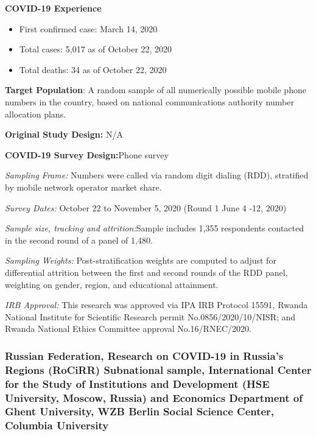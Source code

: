 \documentclass[
  12pt,
]{article}
\begin{document}
\textbf{COVID-19 Experience}

\begin{itemize}
 \item First confirmed case: March 14, 2020
 \item Total cases:  5,017 as of October 22, 2020 
\item Total deaths:  34 as of October 22, 2020 
\end{itemize}

\textbf{Target Population}: A random sample of all numerically possible mobile phone numbers in the country, based on national communications authority number allocation plans.

\textbf{Original Study Design:} N/A

\textbf{COVID-19 Survey Design:}Phone survey

\emph{Sampling Frame:} Numbers were called via random digit dialing (RDD), stratified by mobile network operator market share.

\emph{Survey Dates:} October 22 to November 5, 2020 (Round 1 June 4 -12, 2020)

\emph{Sample size, tracking and attrition:}Sample includes 1,355 respondents contacted in the second round of a panel of 1,480.

\emph{Sampling Weights:} Post-stratification weights are computed to adjust for differential attrition between the first and second rounds of the RDD panel, weighting on gender, region, and educational attainment.

\emph{IRB Approval:} This research was approved via IPA IRB Protocol 15591, Rwanda National Institute for Scientific Research permit No.0856/2020/10/NISR; and Rwanda National Ethics Committee approval No.16/RNEC/2020.

\hypertarget{russian-federation-research-on-covid-19-in-russias-regions-rocirr-subnational-sample-international-center-for-the-study-of-institutions-and-development-hse-university-moscow-russia-and-economics-department-of-ghent-university-wzb-berlin-social-science-center-columbia-university}{%
\subsubsection*{Russian Federation, Research on COVID-19 in Russia's Regions (RoCiRR) Subnational sample, International Center for the Study of Institutions and Development (HSE University, Moscow, Russia) and Economics Department of Ghent University, WZB Berlin Social Science Center, Columbia University}\label{russian-federation-research-on-covid-19-in-russias-regions-rocirr-subnational-sample-international-center-for-the-study-of-institutions-and-development-hse-university-moscow-russia-and-economics-department-of-ghent-university-wzb-berlin-social-science-center-columbia-university}}
\end{document}

